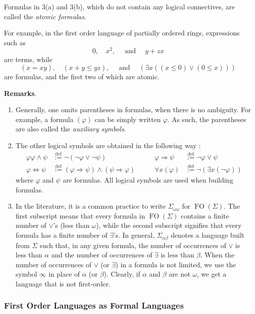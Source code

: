 \documentclass[12pt]{article}
\newcommand{\Or}{\vee}
\newcommand{\Implies}{\Rightarrow}
\newcommand{\Iff}{\Leftrightarrow}
\renewcommand{\And}{\wedge}
\newcommand{\Def}{\overset{\operatorname{def}}{:=}}
\begin{document}
Formulas in 3(a) and 3(b), which do not contain any logical connectives, are called the \emph{atomic formulas}.

For example, in the first order language of partially ordered rings, expressions such as 
$$0,\quad x^2,\quad\mbox{ and } \quad y+zx$$ are terms, while 
$$(x=xy),\quad (x+y \le yz),\quad \mbox{ and }\quad (\exists x ((x\le 0) \Or (0\le x)))$$ are formulas, and the first two of which are atomic.

\textbf{Remarks}.
\begin{enumerate}
\item
Generally, one omits parentheses in formulas, when there is no ambiguity.  For example, a formula $(\varphi)$ can be simply written $\varphi$.  As such, the parentheses are also called the \emph{auxiliary symbols}.
\item
The other logical symbols are obtained in the following way :
\begin{alignat*}
\varphi\varphi\And\psi&\Def\neg(\neg\varphi\Or\neg\psi)&\qquad
\varphi\Implies\psi&\Def\neg\varphi\Or\psi\\
\varphi\Iff\psi&\Def(\varphi\Implies\psi)\And(\psi\Implies\varphi)&\qquad
\forall x(\varphi)&\Def\neg(\exists x(\neg\varphi))
\end{alignat*}
where $\varphi$ and $\psi$ are formulas.  All logical symbols are used when building formulas.
\item
In the literature, it is a common practice to write $\Sigma_{\omega \omega}$ for $\operatorname{FO}(\Sigma)$.  The first subscript means that every formula in $\operatorname{FO}(\Sigma)$ contains a finite number of $\vee$'s (less than $\omega$), while the second subscript signifies that every formula has a finite number of $\exists$'s.  In general, $\Sigma_{\alpha\beta}$ denotes a language built from $\Sigma$ such that, in any given formula, the number of occurrences of $\vee$ is less than $\alpha$ and the number of occurrences of $\exists$ is less than $\beta$.  When the number of occurrences of $\vee$ (or $\exists$) in a formula is not limited, we use the symbol $\infty$ in place of $\alpha$ (or $\beta$).  Clearly, if $\alpha$ and $\beta$ are not $\omega$, we get a language that is not first-order.
\end{enumerate}

\subsubsection*{First Order Languages as Formal Languages}
\end{document}
